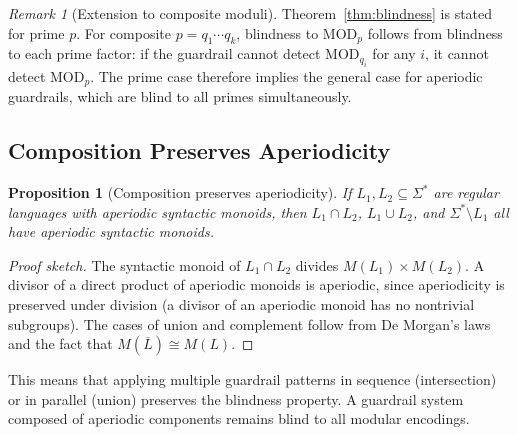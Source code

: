 \documentclass[letterpaper,twocolumn,10pt]{article}
\newtheorem{proposition}[theorem]{Proposition}
\theoremstyle{definition}
\theoremstyle{remark}
\newtheorem{remark}[theorem]{Remark}
\begin{document}
\begin{remark}[Extension to composite moduli]
Theorem~\ref{thm:blindness} is stated for prime $p$.
For composite $p = q_1 \cdots q_k$, blindness to $\mathrm{MOD}_p$ follows from
blindness to each prime factor: if the guardrail cannot detect
$\mathrm{MOD}_{q_i}$ for any $i$, it cannot detect $\mathrm{MOD}_p$.
The prime case therefore implies the general case for aperiodic guardrails,
which are blind to all primes simultaneously.
\end{remark}

\subsection{Composition Preserves Aperiodicity}\label{sec:composition}

\begin{proposition}[Composition preserves aperiodicity]\label{prop:composition}
If $L_1, L_2 \subseteq \Sigma^*$ are regular languages with aperiodic syntactic monoids,
then $L_1 \cap L_2$, $L_1 \cup L_2$, and $\Sigma^* \setminus L_1$ all have aperiodic syntactic monoids.
\end{proposition}
\begin{proof}[Proof sketch]
The syntactic monoid of $L_1 \cap L_2$ divides $M(L_1) \times M(L_2)$.
A divisor of a direct product of aperiodic monoids is aperiodic,
since aperiodicity is preserved under division (a divisor of an aperiodic monoid has no nontrivial subgroups).
The cases of union and complement follow from De Morgan's laws and the fact that $M(\overline{L}) \cong M(L)$.
\end{proof}

This means that applying multiple guardrail patterns in sequence (intersection) or
in parallel (union) preserves the blindness property.
A guardrail system composed of aperiodic components remains blind to all modular encodings.
\end{document}
